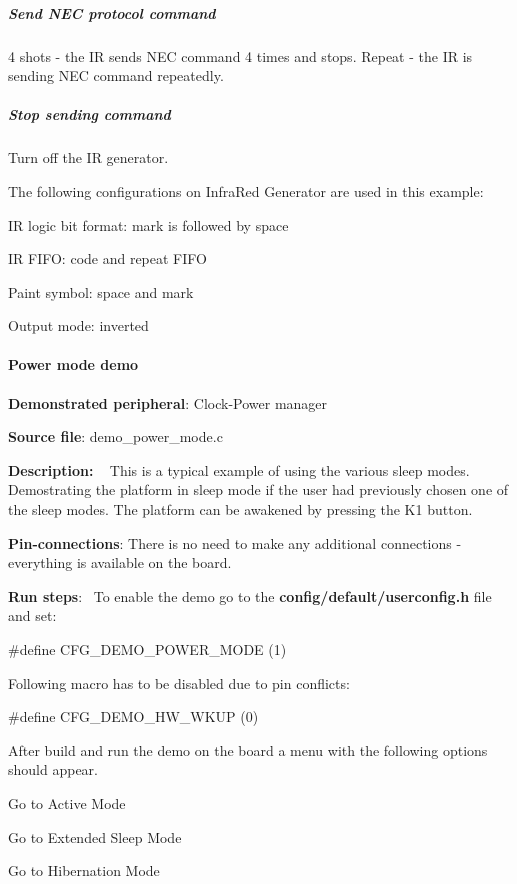 \subparagraph*{Send N\+E\+C protocol command}

4 shots -\/ the I\+R sends N\+E\+C command 4 times and stops. Repeat -\/ the I\+R is sending N\+E\+C command repeatedly.

\subparagraph*{Stop sending command}

Turn off the I\+R generator.

The following configurations on Infra\+Red Generator are used in this example\+:
\begin{DoxyItemize}
\item I\+R logic bit format\+: mark is followed by space
\item I\+R F\+I\+F\+O\+: code and repeat F\+I\+F\+O
\item Paint symbol\+: space and mark
\item Output mode\+: inverted
\end{DoxyItemize}

\paragraph*{Power mode demo}


\begin{DoxyItemize}
\item {\bfseries Demonstrated peripheral}\+: Clock-\/\+Power manager
\item {\bfseries Source file}\+: demo\+\_\+power\+\_\+mode.\+c
\item {\bfseries Description\+:} ~\newline
 This is a typical example of using the various sleep modes. Demostrating the platform in sleep mode if the user had previously chosen one of the sleep modes. The platform can be awakened by pressing the K1 button.
\item {\bfseries Pin-\/connections}\+: There is no need to make any additional connections -\/ everything is available on the board.
\item {\bfseries Run steps}\+:~\newline
 To enable the demo go to the {\bfseries {\ttfamily config/default/userconfig.\+h}} file and set\+: 
\begin{DoxyCode}
\textcolor{preprocessor}{#define CFG\_DEMO\_POWER\_MODE      (1)}
\end{DoxyCode}
 Following macro has to be disabled due to pin conflicts\+: 
\begin{DoxyCode}
\textcolor{preprocessor}{#define CFG\_DEMO\_HW\_WKUP         (0)}
\end{DoxyCode}
 After build and run the demo on the board a menu with the following options should appear.
\begin{DoxyItemize}
\item Go to Active Mode
\item Go to Extended Sleep Mode
\item Go to Hibernation Mode
\end{DoxyItemize}
\end{DoxyItemize}

